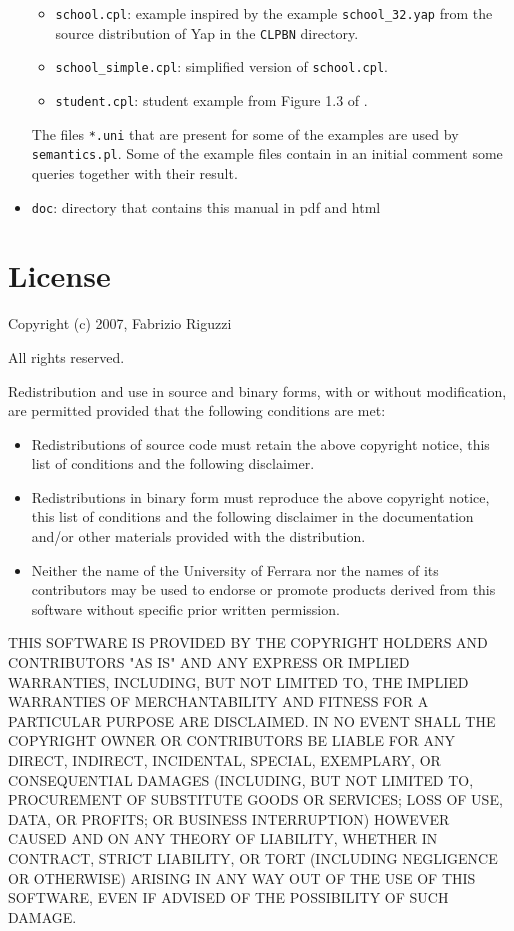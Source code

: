 \documentclass{article}
\begin{document}
\begin{itemize}
\begin{itemize}
\item \texttt{school.cpl}: example inspired by the example \verb|school_32.yap| from the 
source distribution of Yap in the \texttt{CLPBN} directory.
\item \verb|school_simple.cpl|: simplified version of \texttt{school.cpl}.
\item \verb|student.cpl|: student example from Figure 1.3 of \cite{GetFri01-BC}.
\end{itemize}
The files \texttt{*.uni} that are present for some of the examples are used  by \texttt{semantics.pl}. Some of the example files contain in an initial comment some queries together with their result.
\item \verb|doc|: directory that contains this manual in pdf and html
\end{itemize}
\section{License}
\label{license}

Copyright (c) 2007, Fabrizio Riguzzi

All rights reserved.

Redistribution and use in source and binary forms, with or without modification, are permitted provided that the following conditions are met:
\begin{itemize}
\item Redistributions of source code must retain the above copyright notice, this list of conditions and the following disclaimer.
\item Redistributions in binary form must reproduce the above copyright notice, this list of conditions and the following disclaimer in the documentation and/or other materials provided with the distribution.
\item Neither the name of the University of Ferrara nor the names of its contributors may be used to endorse or promote products derived from this software without specific prior written permission.
\end{itemize}
THIS SOFTWARE IS PROVIDED BY THE COPYRIGHT HOLDERS AND CONTRIBUTORS
"AS IS" AND ANY EXPRESS OR IMPLIED WARRANTIES, INCLUDING, BUT NOT
LIMITED TO, THE IMPLIED WARRANTIES OF MERCHANTABILITY AND FITNESS FOR
A PARTICULAR PURPOSE ARE DISCLAIMED. IN NO EVENT SHALL THE COPYRIGHT OWNER OR
CONTRIBUTORS BE LIABLE FOR ANY DIRECT, INDIRECT, INCIDENTAL, SPECIAL,
EXEMPLARY, OR CONSEQUENTIAL DAMAGES (INCLUDING, BUT NOT LIMITED TO,
PROCUREMENT OF SUBSTITUTE GOODS OR SERVICES; LOSS OF USE, DATA, OR
PROFITS; OR BUSINESS INTERRUPTION) HOWEVER CAUSED AND ON ANY THEORY OF
LIABILITY, WHETHER IN CONTRACT, STRICT LIABILITY, OR TORT (INCLUDING
NEGLIGENCE OR OTHERWISE) ARISING IN ANY WAY OUT OF THE USE OF THIS
SOFTWARE, EVEN IF ADVISED OF THE POSSIBILITY OF SUCH DAMAGE.
\end{document}
